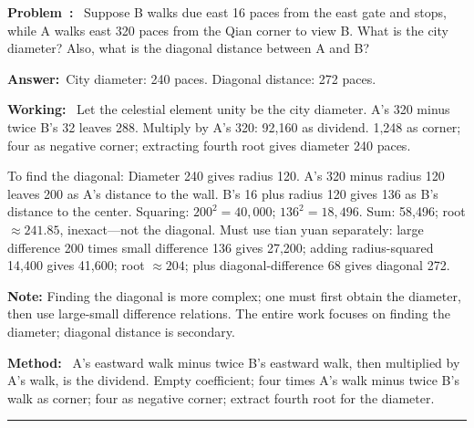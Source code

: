 \documentclass[9pt,a4paper]{article}
\newcounter{overallnum}
\newcommand{\eproblem}[1]{\par\noindent\textbf{\color{volcolor}Problem~\theoverallnum:}~#1\par\vspace{0.15cm}}
\newcommand{\eanswer}[1]{\par\noindent\textbf{Answer:}~#1\par\vspace{0.15cm}}
\newcommand{\eworking}[1]{\par\noindent\textbf{Working:}~#1\par\vspace{0.15cm}}
\newcommand{\emethod}[1]{\par\noindent\textbf{Method:}~#1\par\vspace{0.25cm}}
\begin{document}
\begin{minipage}[t]{0.50\textwidth}
\eproblem{
Suppose B walks due east 16 paces from the east gate and stops, while A walks
east 320 paces from the Qian corner to view B. What is the city diameter?
Also, what is the diagonal distance between A and B?
}

\eanswer{City diameter: 240 paces. Diagonal distance: 272 paces.}

\eworking{
Let the celestial element unity be the city diameter. A's 320 minus twice
B's 32 leaves 288. Multiply by A's 320: 92,160 as dividend. 1,248 as corner;
four as negative corner; extracting fourth root gives diameter 240 paces.

To find the diagonal: Diameter 240 gives radius 120. A's 320 minus radius 120
leaves 200 as A's distance to the wall. B's 16 plus radius 120 gives 136 as
B's distance to the center. Squaring: $200^2 = 40{,}000$; $136^2 = 18{,}496$.
Sum: 58,496; root $\approx 241.85$, inexact---not the diagonal. Must use tian
yuan separately: large difference 200 times small difference 136 gives
27,200; adding radius-squared 14,400 gives 41,600; root $\approx 204$;
plus diagonal-difference 68 gives diagonal 272.

\textbf{Note:} Finding the diagonal is more complex; one must first obtain
the diameter, then use large-small difference relations. The entire work
focuses on finding the diameter; diagonal distance is secondary.
}

\emethod{
A's eastward walk minus twice B's eastward walk, then multiplied by A's walk,
is the dividend. Empty coefficient; four times A's walk minus twice B's walk
as corner; four as negative corner; extract fourth root for the diameter.
}
\end{minipage}
\vspace{0.15cm}

\vspace{0.15cm}
\noindent\rule{\textwidth}{0.2pt}
\vspace{0.15cm}
\end{document}
